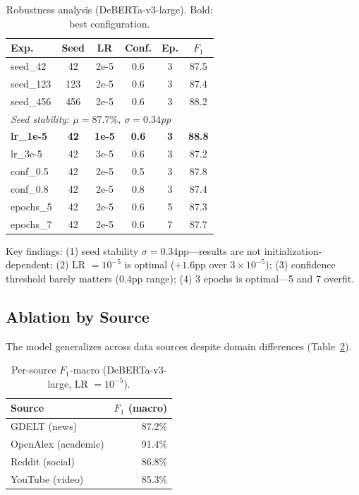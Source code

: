 \documentclass{article}
\begin{document}
\begin{table}[t]
\centering
\small
\caption{Robustness analysis (DeBERTa-v3-large). Bold: best configuration.}
\label{tab:robustness}
\begin{tabular}{lccccc}
\toprule
\textbf{Exp.} & \textbf{Seed} & \textbf{LR} & \textbf{Conf.} & \textbf{Ep.} & \textbf{$F_1$} \\
\midrule
seed\_42 & 42 & 2e-5 & 0.6 & 3 & 87.5 \\
seed\_123 & 123 & 2e-5 & 0.6 & 3 & 87.4 \\
seed\_456 & 456 & 2e-5 & 0.6 & 3 & 88.2 \\
\midrule
\multicolumn{5}{l}{\textit{Seed stability: $\mu = 87.7\%$, $\sigma = 0.34$pp}} & \\
\midrule
\textbf{lr\_1e-5} & \textbf{42} & \textbf{1e-5} & \textbf{0.6} & \textbf{3} & \textbf{88.8} \\
lr\_3e-5 & 42 & 3e-5 & 0.6 & 3 & 87.2 \\
\midrule
conf\_0.5 & 42 & 2e-5 & 0.5 & 3 & 87.8 \\
conf\_0.8 & 42 & 2e-5 & 0.8 & 3 & 87.4 \\
\midrule
epochs\_5 & 42 & 2e-5 & 0.6 & 5 & 87.3 \\
epochs\_7 & 42 & 2e-5 & 0.6 & 7 & 87.7 \\
\bottomrule
\end{tabular}
\end{table}

Key findings: (1) seed stability $\sigma = 0.34$pp---results are not initialization-dependent; (2) LR $= 10^{-5}$ is optimal ($+1.6$pp over $3 \times 10^{-5}$); (3) confidence threshold barely matters ($0.4$pp range); (4) 3 epochs is optimal---5 and 7 overfit.

\subsection{Ablation by Source}

The model generalizes across data sources despite domain differences (Table~\ref{tab:source-ablation}).

\begin{table}[t]
\centering
\small
\caption{Per-source $F_1$-macro (DeBERTa-v3-large, LR $= 10^{-5}$).}
\label{tab:source-ablation}
\begin{tabular}{lr}
\toprule
\textbf{Source} & \textbf{$F_1$ (macro)} \\
\midrule
GDELT (news) & 87.2\% \\
OpenAlex (academic) & 91.4\% \\
Reddit (social) & 86.8\% \\
YouTube (video) & 85.3\% \\
\bottomrule
\end{tabular}
\end{table}
\end{document}
